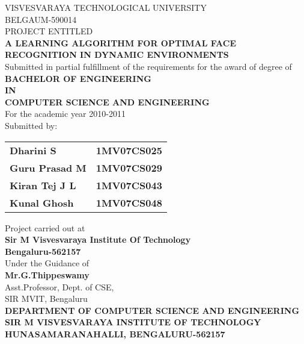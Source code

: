 \documentclass[10pt,a4paper]{article}
\newcommand{\tab}{\hspace*{6 cm}}
\begin{document}
\begin{center}
VISVESVARAYA TECHNOLOGICAL UNIVERSITY \\ BELGAUM-590014 \\

\vspace{5mm}
PROJECT ENTITLED\\
\vspace{5mm}
\textbf{A LEARNING ALGORITHM FOR OPTIMAL FACE RECOGNITION IN DYNAMIC ENVIRONMENTS}\\
\vspace{5mm}
Submitted in partial fulfillment of the requirements for the award of degree of \\
\vspace{5mm}
\textbf{BACHELOR OF ENGINEERING}\\
\textbf{IN}\\
\textbf{COMPUTER SCIENCE AND ENGINEERING}\\
\vspace{5mm}
For the academic year 2010-2011\\
\vspace{5mm}
Submitted by:
\vspace{5mm}
\\
\begin{table}[h]
\begin{tabular}{lr}
\textbf{Dharini S} \tab & \textbf{1MV07CS025}   \\
\textbf{Guru Prasad M} \tab & \textbf{1MV07CS029}   \\
\textbf{Kiran Tej J L}  \tab & \textbf{1MV07CS043}  \\
\textbf{Kunal Ghosh} \tab &  \textbf{1MV07CS048}   \\ 
\end{tabular}
\end{table}
\vspace{5mm}
Project carried out at \\
\vspace{5mm}
\textbf{Sir M Visvesvaraya Institute Of Technology}\\
\vspace{5mm}
\textbf{Bengaluru-562157}\\
\vspace{5mm}
Under the Guidance of\\
\vspace{5mm}
\textbf{Mr.G.Thippeswamy}\\
\vspace{5mm}
Asst.Professor, Dept. of CSE,\\
\vspace{5mm}
SIR MVIT, Bengaluru\\
\vspace{5mm}
\textbf{DEPARTMENT OF COMPUTER SCIENCE AND ENGINEERING}\\
\vspace{2mm}
\textbf{SIR M VISVESVARAYA INSTITUTE OF TECHNOLOGY}\\
\vspace{2mm}
\textbf{HUNASAMARANAHALLI, BENGALURU-562157}\\

\end{center}
\end{document}
